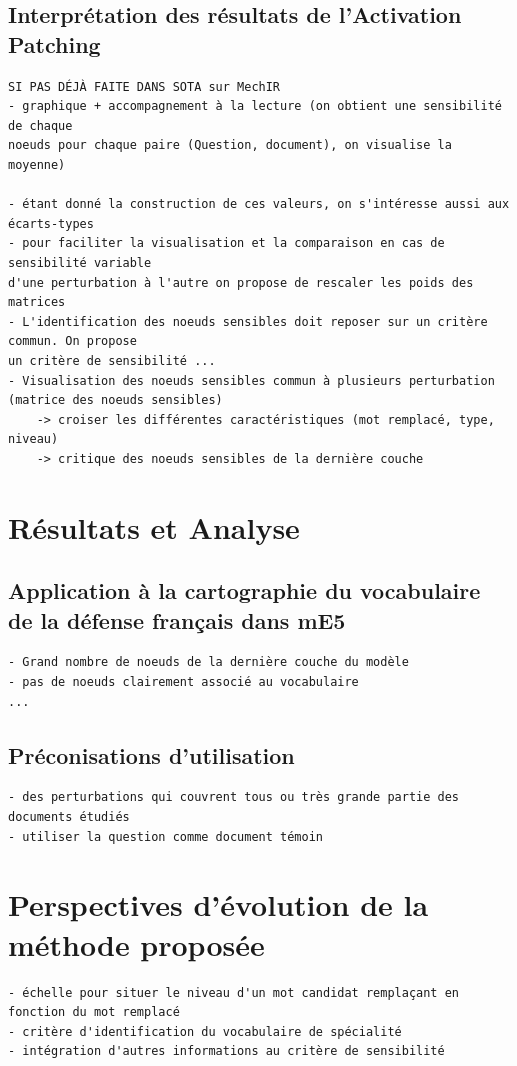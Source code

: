     \subsection{Interprétation des résultats de l'Activation Patching}

        \begin{verbatim}
SI PAS DÉJÀ FAITE DANS SOTA sur MechIR
- graphique + accompagnement à la lecture (on obtient une sensibilité de chaque 
noeuds pour chaque paire (Question, document), on visualise la moyenne)

- étant donné la construction de ces valeurs, on s'intéresse aussi aux écarts-types
- pour faciliter la visualisation et la comparaison en cas de sensibilité variable 
d'une perturbation à l'autre on propose de rescaler les poids des matrices
- L'identification des noeuds sensibles doit reposer sur un critère commun. On propose
un critère de sensibilité ...
- Visualisation des noeuds sensibles commun à plusieurs perturbation (matrice des noeuds sensibles)
    -> croiser les différentes caractéristiques (mot remplacé, type, niveau)
    -> critique des noeuds sensibles de la dernière couche
        \end{verbatim}

\section{Résultats et Analyse}

    \subsection{Application à la cartographie du vocabulaire de la défense français dans mE5}
        \begin{verbatim}
- Grand nombre de noeuds de la dernière couche du modèle
- pas de noeuds clairement associé au vocabulaire
...
        \end{verbatim}


    \subsection{Préconisations d'utilisation}
        \begin{verbatim}
- des perturbations qui couvrent tous ou très grande partie des documents étudiés
- utiliser la question comme document témoin
        \end{verbatim}


\section{Perspectives d'évolution de la méthode proposée}

    \begin{verbatim}
- échelle pour situer le niveau d'un mot candidat remplaçant en fonction du mot remplacé
- critère d'identification du vocabulaire de spécialité
- intégration d'autres informations au critère de sensibilité
    \end{verbatim}